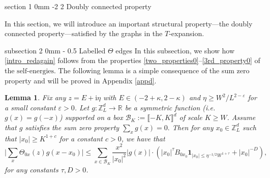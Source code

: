 \documentclass{article}
\makeatletter
\newcommand{\1}{\mathds{1}}
\numberwithin{equation}{section}
\newcommand{\e}{{\varepsilon}}
\renewcommand{\cal}{\mathcal}
\newcommand{\ii}{\mathrm{i}} %
\renewcommand{\leq}{\leqslant}
\renewcommand{\geq}{\geqslant}
\renewcommand{\le}{\leq}
\renewcommand{\ge}{\geq}
\newcommand{\R}{\mathbb{R}}
\newcommand{\Z}{\mathbb{Z}}
\newcommand{\dashed}{\text{diffusive}}
\newcommand{\selfs}{\text{self-energies}}
\theoremstyle{plain} %
\newtheorem{lemma}[theorem]{Lemma}
\theoremstyle{remark}
\newcommand{\cor}{\color{red}}
\newcommand{\Sdelta}{{\Sigma}_T}
\newcommand{\Sele}{{\mathcal E}}
\renewcommand{\section}{\@startsection
{section}%
{1}%
{0mm}%
{-2\baselineskip}%
{2\baselineskip}%
{\normalfont\large\scshape\centering}} %
\renewcommand{\subsection}{\@startsection
{subsection}%
{2}%
{0mm}%
{-\baselineskip}%
{0.5\baselineskip}%
{\normalfont\bf\itshape}} %
\newcommand{\hty}[1]{{\cor (ht: #1) }}
\makeatother
\begin{document}
\section{Doubly connected property}\label{sec double} 

In this section, we will introduce an important structural property---the doubly connected property---satisfied by the graphs in the $T$-expansion. 


\subsection{Labelled $\Theta$ edges}
In this subsection, we show how \eqref{intro_redagain} follows from the properties \eqref{two_properties0}--\eqref{3rd_property0} of the $\selfs$. %
The following lemma is a simple consequence of the sum zero property and will be proved in Appendix \ref{appd}. 
 
\begin{lemma}\label{lem cancelTheta}
Fix any $z=E+\ii \eta$ with $E\in (-2+\kappa,2-\kappa)$ and $\eta\ge W^{2}/L^{2-\e}$ for a small constant $\e>0$. Let $g:\Z_L^d \to \R$ be a symmetric function (i.e. $g(x)=g(-x)$) supported on a box $\cal B_K:=\llbracket -K,K\rrbracket^d$ of scale $K\ge W$. Assume that $g$ satisfies the sum zero property $\sum_{x}g(x)=0.$ Then for any $x_0\in \Z_L^d$ such that $|x_0| \ge K^{1+c}$ for a constant $c>0$, we have that 
$$\Big|\sum_{x}\Theta_{0 x}(z) g(x-x_0)\Big| \le   \sum_{x\in \cal B_K}\frac{x^2}{|x_0|^2}|g(x)| \cdot \left(  |x_0|^\tau  B_{0 x_0} \mathbf 1_{|x_0|\le   \eta^{-1/2}W^{1+\tau}}   +  |x_0|^{-D} \right),$$
for any constants $\tau,D>0$.%
\end{lemma}
\end{document}
